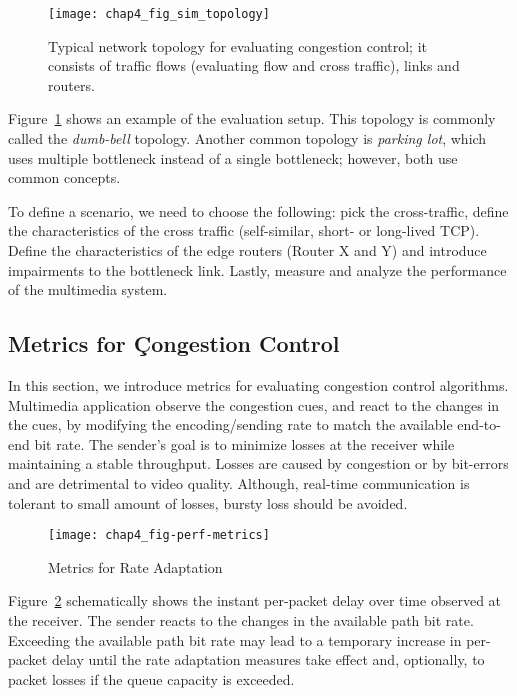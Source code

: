 \begin{figure}
\texttt{[image: chap4\_fig\_sim\_topology]}
\caption{Typical network topology for evaluating congestion control; it
consists of traffic flows (evaluating flow and cross traffic), links and
routers.} 
\label{fig:4:topology}
\end{figure}


Figure~\ref{fig:4:topology} shows an example of the evaluation setup. This
topology is commonly called the \emph{dumb-bell} topology. Another common
topology is \emph{parking lot}, which uses multiple bottleneck instead of a
single bottleneck; however, both use common concepts. 


To define a scenario, we need to choose the following: pick the cross-traffic,
define the characteristics of the cross traffic (self-similar, short- or
long-lived TCP). Define the characteristics of the edge routers (Router X and
Y) and introduce impairments to the bottleneck link. Lastly, measure and
analyze the performance of the multimedia system. 

\subsection{Metrics for Çongestion Control}
\label{subsec.metrics}

In this section, we introduce metrics for evaluating congestion control
algorithms. Multimedia application observe the congestion cues, and react to
the changes in the cues, by modifying the encoding/sending rate to match the
available end-to-end bit rate. The sender's goal is to minimize losses at the
receiver while maintaining a stable throughput. Losses are caused by
congestion or by  bit-errors and are detrimental to video quality. Although,
real-time communication is tolerant to small amount of losses, bursty loss
should be avoided.  




\begin{figure}
\centering
\texttt{[image: chap4\_fig-perf-metrics]}
\caption{Metrics for Rate Adaptation}
\label{fig:4:rc_model}
\end{figure}

Figure~\ref{fig:4:rc_model} schematically shows the instant per-packet delay
over time observed at the receiver. The sender reacts to the changes in the
available path bit rate. Exceeding the available path bit rate may lead to a
temporary increase in per-packet delay until the rate adaptation measures take
effect and, optionally, to packet losses if the queue capacity is exceeded.

